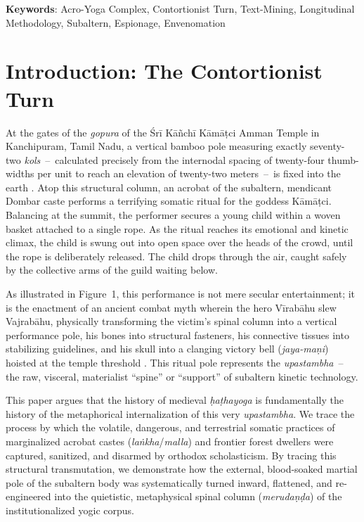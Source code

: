 \documentclass[11pt,twoside,letterpaper]{article}
\newcommand{\gdash}{\, -- \,}
\begin{document}
\textbf{Keywords}: Acro-Yoga Complex, Contortionist Turn, Text-Mining, Longitudinal Methodology, Subaltern, Espionage, Envenomation


\newpage



\section{Introduction: The Contortionist Turn}

At the gates of the \textit{gopura} of the Śrī Kāñchī Kāmāṭci Amman Temple in Kanchipuram, Tamil Nadu, a vertical bamboo pole measuring exactly seventy-two \textit{kols}\gdash calculated precisely from the internodal spacing of twenty-four thumb-widths per unit to reach an elevation of twenty-two meters\gdash is fixed into the earth \citep{Raghavan1978, Stanley-Millson1984}. Atop this structural column, an acrobat of the subaltern, mendicant Dombar caste performs a terrifying somatic ritual for the goddess Kāmāṭci. Balancing at the summit, the performer secures a young child within a woven basket attached to a single rope. As the ritual reaches its emotional and kinetic climax, the child is swung out into open space over the heads of the crowd, until the rope is deliberately released. The child drops through the air, caught safely by the collective arms of the guild waiting below.

As illustrated in Figure~1, this performance is not mere secular entertainment; it is the enactment of an ancient combat myth wherein the hero Vīrabāhu slew Vajrabāhu, physically transforming the victim's spinal column into a vertical performance pole, his bones into structural fasteners, his connective tissues into stabilizing guidelines, and his skull into a clanging victory bell (\textit{jaya-maṇi}) hoisted at the temple threshold \citep{ThurstonRangachari1909}. This ritual pole represents the \textit{upastambha}\gdash the raw, visceral, materialist ``spine'' or ``support'' of subaltern kinetic technology.

This paper argues that the history of medieval \textit{ḥaṭhayoga} is fundamentally the history of the metaphorical internalization of this very \textit{upastambha}. We trace the process by which the volatile, dangerous, and terrestrial somatic practices of marginalized acrobat castes (\textit{la\.{n}kha}/\textit{malla}) and frontier forest dwellers were captured, sanitized, and disarmed by orthodox scholasticism. By tracing this structural transmutation, we demonstrate how the external, blood-soaked martial pole of the subaltern body was systematically turned inward, flattened, and re-engineered into the quietistic, metaphysical spinal column (\textit{merudaṇḍa}) of the institutionalized yogic corpus.
\end{document}
